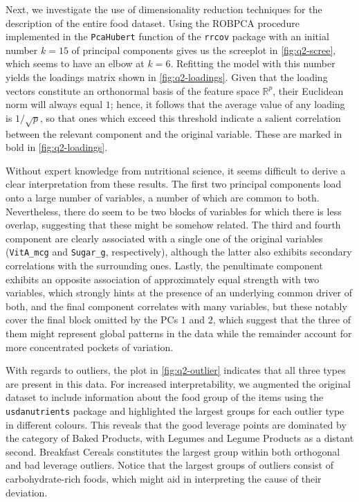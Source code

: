 \documentclass[titlepage]{article}
\begin{document}
Next, we investigate the use of dimensionality reduction techniques for the description of the entire food dataset. Using the ROBPCA procedure implemented in the \texttt{PcaHubert} function of the \texttt{rrcov} package \cite{rrcov} with an initial number $k = 15$ of principal components gives us the screeplot in \cref{fig:q2-scree}, which seems to have an elbow at $k = 6$. Refitting the model with this number yields the loadings matrix shown in \cref{fig:q2-loadings}. Given that the loading vectors constitute an orthonormal basis of the feature space $\mathbb{R}^p$, their Euclidean norm will always equal $1$; hence, it follows that the average value of any loading is $1 / \sqrt{p}$, so that ones which exceed this threshold indicate a salient correlation between the relevant component and the original variable. These are marked in bold in \cref{fig:q2-loadings}.

Without expert knowledge from nutritional science, it seems difficult to derive a clear interpretation from these results. The first two principal components load onto a large number of variables, a number of which are common to both. Nevertheless, there do seem to be two blocks of variables for which there is less overlap, suggesting that these might be somehow related. The third and fourth component are clearly associated with a single one of the original variables (\texttt{VitA\_mcg} and \texttt{Sugar\_g}, respectively), although the latter also exhibits secondary correlations with the surrounding ones. Lastly, the penultimate component exhibits an opposite association of approximately equal strength with two variables, which strongly hints at the presence of an underlying common driver of both, and the final component correlates with many variables, but these notably cover the final block omitted by the PCs $1$ and $2$, which suggest that the three of them might represent global patterns in the data while the remainder account for more concentrated pockets of variation.

With regards to outliers, the plot in \cref{fig:q2-outlier} indicates that all three types are present in this data. For increased interpretability, we augmented the original dataset to include information about the food group of the items using the \texttt{usdanutrients} package \cite{usdanutrients} and highlighted the largest groups for each outlier type in different colours. This reveals that the good leverage points are dominated by the category of Baked Products, with Legumes and Legume Products as a distant second. Breakfast Cereals constitutes the largest group within both orthogonal and bad leverage outliers. Notice that the largest groups of outliers consist of carbohydrate-rich foods, which might aid in interpreting the cause of their deviation.
\end{document}
